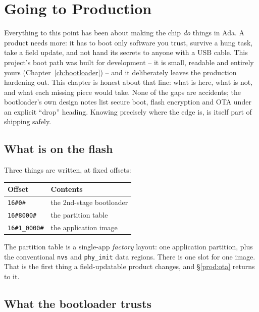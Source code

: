 \chapter{Going to Production}
\label{ch:production}

Everything to this point has been about making the chip \emph{do} things in Ada. A
product needs more: it has to boot only software you trust, survive a hung task,
take a field update, and not hand its secrets to anyone with a USB cable. This
project's boot path was built for development -- it is small, readable and entirely
yours (Chapter~\ref{ch:bootloader}) -- and it deliberately leaves the production
hardening out. This chapter is honest about that line: what is here, what is not,
and what each missing piece would take. None of the gaps are accidents; the
bootloader's own design notes list secure boot, flash encryption and OTA under an
explicit ``drop'' heading. Knowing precisely where the edge is, is itself part of
shipping safely.

\section{What is on the flash}

Three things are written, at fixed offsets:

\begin{center}
\begin{tabular}{l l}
\toprule
\textbf{Offset} & \textbf{Contents} \\ \midrule
\texttt{16\#0\#}       & the 2nd-stage bootloader \\
\texttt{16\#8000\#}    & the partition table \\
\texttt{16\#1\_0000\#} & the application image \\
\bottomrule
\end{tabular}
\end{center}

The partition table is a single-app \emph{factory} layout: one application
partition, plus the conventional \texttt{nvs} and \texttt{phy\_init} data regions.
There is one slot for one image. That is the first thing a field-updatable product
changes, and \S\ref{prod:ota} returns to it.

\section{What the bootloader trusts}

